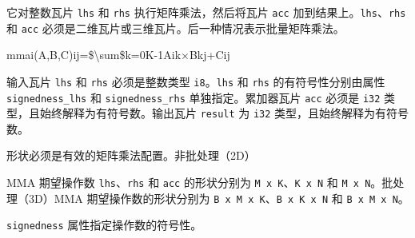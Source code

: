 \documentclass{article}
\begin{document}
它对整数瓦片 \texttt{lhs} 和 \texttt{rhs} 执行矩阵乘法，然后将瓦片 \texttt{acc} 加到结果上。\texttt{lhs}、\texttt{rhs} 和 \texttt{acc} 必须是二维瓦片或三维瓦片。后一种情况表示批量矩阵乘法。


mmai(A,B,C)ij=\$\textbackslash{}sum\$k=0K-1Aik×Bkj+Cij

输入瓦片 \texttt{lhs} 和 \texttt{rhs} 必须是整数类型 \texttt{i8}。\texttt{lhs} 和 \texttt{rhs} 的有符号性分别由属性 \texttt{signedness\_lhs} 和 \texttt{signedness\_rhs} 单独指定。累加器瓦片 \texttt{acc} 必须是 \texttt{i32} 类型，且始终解释为有符号数。输出瓦片 \texttt{result} 为 \texttt{i32} 类型，且始终解释为有符号数。


形状必须是有效的矩阵乘法配置。非批处理（2D）

MMA 期望操作数 \texttt{lhs}、\texttt{rhs} 和 \texttt{acc} 的形状分别为 \texttt{M x K}、\texttt{K x N} 和 \texttt{M x N}。批处理（3D）MMA 期望操作数的形状分别为 \texttt{B x M x K}、\texttt{B x K x N} 和 \texttt{B x M x N}。


\texttt{signedness} 属性指定操作数的符号性。
\end{document}
